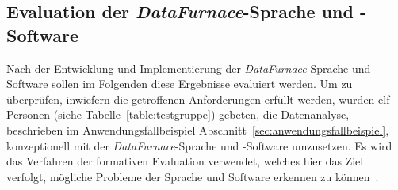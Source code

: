 \documentclass[
  language=german, %
  type=bachelor,%
  ngerman
]{isthesis}
\begin{document}
\begin{content}


%  


\chapter{Evaluation der \textit{DataFurnace}-Sprache und -Software}\label{ch:evaluation}

Nach der Entwicklung und Implementierung der \textit{DataFurnace}-Sprache und
-Software sollen im Folgenden diese Ergebnisse evaluiert werden. Um zu
überprüfen, inwiefern die getroffenen Anforderungen erfüllt werden, wurden elf
Personen (siehe Tabelle~\ref{table:testgruppe}) gebeten, die Datenanalyse,
beschrieben im Anwendungsfallbeispiel
Abschnitt~\ref{sec:anwendungsfallbeispiel}, konzeptionell mit der
\textit{DataFurnace}-Sprache und -Software umzusetzen. Es wird das Verfahren
der formativen Evaluation verwendet, welches hier das Ziel verfolgt, mögliche
Probleme der Sprache und Software erkennen zu können~\cite[][S. 9]{hegner2003methoden}.


\end{content}
\end{document}
